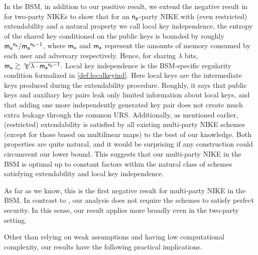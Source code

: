  In the BSM, in addition to our positive result, we extend the negative result in \cite{EC:DziMau04} for two-party NIKEs to show that for an $\mathsf{n_p}$-party NIKE with (even restricted) extendability and a natural property we call local key independence, the entropy of the shared key conditioned on the public keys is bounded by roughly $\mathsf{m_u}^{\mathsf{n_p}}/\mathsf{m_a}^{\mathsf{n_p}-1}$, where $\mathsf{m_u}$ and $\mathsf{m_a}$  represent the amounts of memory consumed by each user and adversary respectively. Hence, for sharing $\lambda$ bits,
$
\mathsf{m_u}\gtrsim \sqrt[\mathsf{n_p}]{\lambda\cdot\mathsf{m_a}^{\mathsf{n_p}-1}}.
$
Local key independence is the BSM-specific regularity condition formalized in \cref{def:localkeyind}. Here local keys are the intermediate keys produced during the extendability procedure. Roughly, it says that public keys and auxiliary key pairs leak only limited information about local keys, and that adding one more independently generated key pair does not create much extra leakage through the common URS. %
 Additionally, as mentioned earlier, (restricted) extendability is satisfied by all existing multi-party NIKE schemes  (except for those based on multilinear maps) to the best of our knowledge. Both properties are quite natural, and it would be surprising if any construction could circumvent our lower bound.
This suggests that our multi-party NIKE in the BSM is optimal up to constant factors within the natural class of schemes satisfying extendability and local key independence. 

As far as we know, this is the first negative result for multi-party NIKE in the BSM. In contrast to \cite{EC:DziMau04}, our analysis does not require the schemes to satisfy perfect security. In this sense, our result applies more broadly even in the two-party setting.

Other than relying on weak assumptions and having low computational complexity, our results have the following practical implications.


